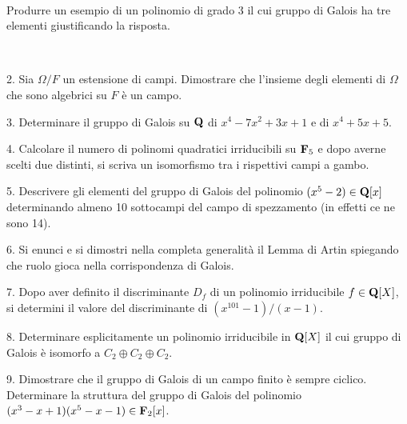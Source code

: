 \ \dotfill\ \bigskip\bigskip\bigskip\vfil

 Produrre un esempio di un polinomio di grado 3 il cui gruppo di Galois ha tre elementi giustificando la risposta.\medskip\bigskip\bigskip

\ \dotfill\ \bigskip\bigskip\bigskip

\vfil\eject


\item{2.} Sia $\Omega/F$ un estensione di campi. Dimostrare che l’insieme degli elementi di $\Omega$ che sono algebrici su $F$ \`e un campo.  
\vv


\item{3.} Determinare il gruppo di Galois su ${\bf Q}$ di $x^4 - 7x^2 + 3x + 1$ e 
di $x^4+5x+5$.\vv



\item{4.} Calcolare il numero di polinomi quadratici irriducibili su
${\bf F}_5$ e dopo averne scelti due distinti, si scriva un isomorfismo tra i
rispettivi campi a gambo. 
\ve\ \vs

\item{5.} Descrivere gli elementi del gruppo di Galois del polinomio $(x^5-2)\in{\bf Q}[x]$ determinando almeno 10 sottocampi del campo di spezzamento (in effetti ce ne sono 14).
\vv


\item{6.} Si enunci e si dimostri nella completa generalit\`a il Lemma di Artin spiegando che ruolo gioca nella corrispondenza di Galois.\vv


\item{7.} Dopo aver definito il discriminante $D_f$ di un polinomio irriducibile $f\in{\bf Q}[X]$, si determini il valore del discriminante di $(x^{101}-1)/(x-1)$.\ve\ \vs

\item{8.} Determinare esplicitamente un polinomio irriducibile in ${\bf Q}[X]$ 
il cui gruppo di Galois \`e isomorfo a 
$C_{2}\oplus C_{2}\oplus C_2$. 
\vv

\item{9.} 
 Dimostrare che il gruppo di Galois di un campo finito \`e sempre ciclico.
 Determinare la struttura del gruppo di Galois del polinomio $(x^3-x+1)(x^5-x-1)\in{\bf F}_2[x]$.
\ \vst
 \bye
